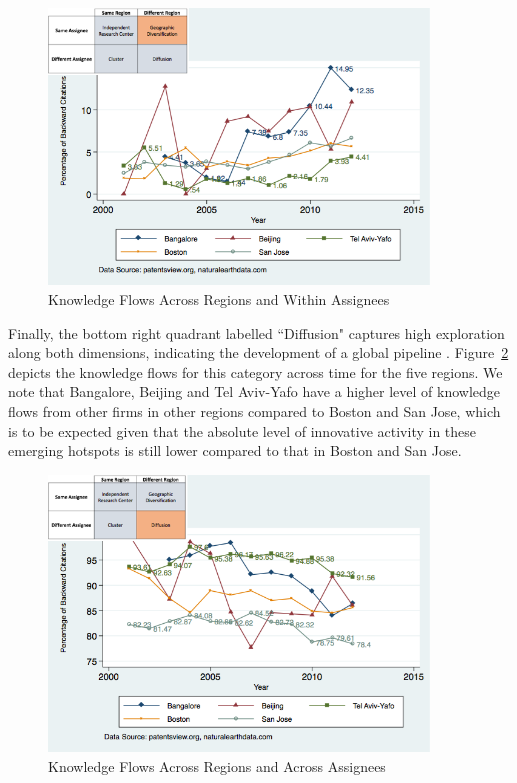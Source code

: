 \documentclass[12pt,letterpaper]{article}
\begin{document}
\begin{figure}[h!]
\begin{centering}
  \caption{\newline Knowledge Flows Across Regions and Within Assignees}
  \label{fig:SMSDiffRegionSameAssigneeFlows}
  \includegraphics[width=0.90\textwidth]{SMSDiffRegionSameAssigneeFlows}
\end{centering}
\end{figure}

Finally, the bottom right quadrant labelled ``Diffusion" captures high exploration along both dimensions, indicating the development of a global pipeline \citep*{Bathelt2004}. Figure~\ref{fig:SMSDiffRegionDiffAssigneeFlows} depicts the  knowledge flows for this category across time for the five regions. We note that Bangalore, Beijing and Tel Aviv-Yafo have a higher level of knowledge flows from other firms in other regions compared to Boston and San Jose, which is to be expected given that the absolute level of innovative activity in these emerging hotspots is still lower compared to that in Boston and San Jose. \par

\begin{figure}[h!]
\begin{centering}
  \caption{\newline Knowledge Flows Across Regions and Across Assignees}
  \label{fig:SMSDiffRegionDiffAssigneeFlows}
  \includegraphics[width=0.90\textwidth]{SMSDiffRegionDiffAssigneeFlows}
\end{centering}
\end{figure}
\end{document}
